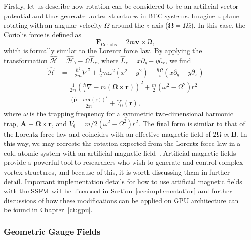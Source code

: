 Firstly, let us describe how rotation can be considered to be an artificial vector potential and thus generate vortex structures in BEC systems.
Imagine a plane rotating with an angular velocity $\Omega$ around the $z$-axis ($\mathbf{\Omega} = \Omega \hat z$). 
In this case, the Coriolis force is defined as
\begin{equation}
\mathbf{F}_{\text{Coriolis}} = 2m \mathbf{v} \times \mathbf{\Omega},
\end{equation}
which is formally similar to the Lorentz force law.
By applying the transformation $\mathcal{\hat H} = \mathcal{\hat H}_0 - \Omega \hat L_z$, where $\hat L_z = x\partial_y - y\partial_x$, we find~\cite{bhat2008}
\begin{equation}
\begin{split}
\mathcal{\hat H} &= -\frac{\hbar^2}{2m}\nabla^2 + \frac 1 2 m \omega^2(x^2 + y^2) - \frac{\hbar \Omega}{i}(x\partial_y - y\partial_x) \\
 &= \frac{1}{2m}\left(\frac{\hbar}{i}\nabla - m(\mathbf{\Omega} \times \mathbf{r})\right)^2 + \frac m 2 \left( \omega^2 - \Omega^2 \right)r^2 \\
 &= \frac{(\hat{\mathbf{p}}-m\mathbf{A}(\mathbf{r}))^2}{2m}+ V_0(\mathbf{r}),
\end{split}
\end{equation}
where $\omega$ is the trapping frequency for a symmetric two-dimensional harmonic trap, $\mathbf{A} \equiv \mathbf{\Omega} \times \mathbf{r}$, and $V_0 = m/2 \left( \omega^2 - \Omega^2 \right)r^2$.
The final form is similar to that of the Lorentz force law and coincides with an effective magnetic field of $2 \mathbf \Omega \propto \mathbf B$.
In this way, we may recreate the rotation expected from the Lorentz force law in a cold atomic system with an artificial magnetic field~\cite{peshkin1989, madison2000, abo2001}.
Artificial magnetic fields provide a powerful tool to researchers who wish to generate and control complex vortex structures, and because of this, it is worth discussing them in further detail.
Important implementation details for how to use artificial magnetic fields with the SSFM will be discussed in Section~\ref{sec:implementation} and further discussions of how these modifications can be applied on GPU architecture can be found in Chapter~\ref{ch:gpu}.

\subsubsection{Geometric Gauge Fields}
\label{sec:geom}

